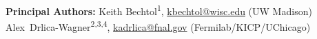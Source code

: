 
\def\altaffilmark#1{\textsuperscript{#1}}
\def\affil#1{\noindent #1 \\}

\noindent \textbf{Principal Authors:} 
Keith Bechtol\altaffilmark{1}, \href{mailto:kbechtol@wisc.edu}{kbechtol@wisc.edu} (UW Madison)\\
Alex~Drlica-Wagner\altaffilmark{2,3,4}, \href{mailto:kadrlica@fnal.gov}{kadrlica@fnal.gov} (Fermilab/KICP/UChicago)



